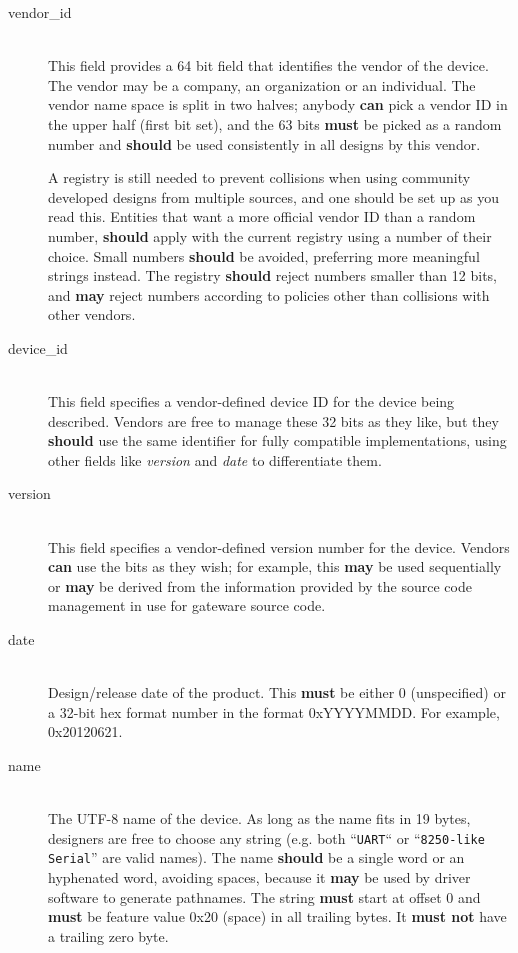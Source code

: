 \documentclass[a4paper, 12pt]{article}
\begin{document}
\begin{description}
\item[vendor\_id] \hfill \\
This field provides a 64 bit field that identifies the vendor of the device. The vendor may
be a company, an organization or an individual. The vendor name space is split in two halves;
anybody \textbf{can} pick a vendor ID in the upper half (first bit set), and the
63 bits \textbf{must} be picked as a random number and \textbf{should} be used consistently
in all designs by this vendor.

A registry is still needed to prevent collisions when using community developed designs from
multiple sources, and one should be set up as you read this.
Entities that want a more official vendor
ID than a random number, \textbf{should} apply with the current registry using a number of their choice.
Small
numbers \textbf{should} be avoided, preferring more meaningful strings instead. The
registry \textbf{should} reject numbers smaller than 12 bits, and \textbf{may} reject numbers
according to policies other than collisions with other vendors.

\item[device\_id] \hfill \\
This field specifies a vendor-defined device ID for the device being described.
Vendors are free to manage these 32 bits as they like, but they \textbf{should} use
the same identifier for fully compatible implementations, using other fields like \textit{version}
and \textit{date} to differentiate them.

\item[version] \hfill \\
This field specifies a vendor-defined version number for the device. Vendors
\textbf{can} use the bits as they wish; for example, this \textbf{may} be used sequentially
or \textbf{may} be derived from the information provided by the source code management in use
for gateware source code.


\item[date] \hfill \\
Design/release date of the product. This \textbf{must} be either 0 (unspecified) or a 32-bit hex
format number in the format 0xYYYYMMDD. For example, 0x20120621.

\item[name] \hfill \\
The UTF-8 name of the device. As long as the name fits in 19 bytes, designers are free to choose
any string (e.g. both ``\texttt{UART}`` or ``\texttt{8250-like Serial}'' are valid names).
The name \textbf{should} be a single word or an hyphenated word, avoiding spaces, because it \textbf{may}
be used by driver software to generate pathnames.  The string \textbf{must} start at offset 0
and \textbf{must} be feature value 0x20 (space) in all trailing bytes.
It \textbf{must not} have a trailing zero byte.


\end{description}
\end{document}
